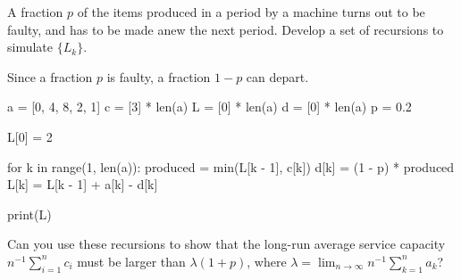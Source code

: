 \begin{exercise}
\label{ex:88}
 A fraction
$p$ of the items produced in a period by a machine  turns out to be faulty, and has to be made anew the next period.
 Develop a set of recursions to simulate $\{L_k\}$.
\begin{solution}

Since a fraction $p$ is faulty, a fraction $1-p$ can depart.
\begin{pyconsole}
a = [0, 4, 8, 2, 1]
c = [3] * len(a)
L = [0] * len(a)
d = [0] * len(a)
p = 0.2

L[0] = 2

for k in range(1, len(a)):
    produced = min(L[k - 1], c[k])
    d[k] = (1 - p) * produced
    L[k] = L[k - 1] + a[k] - d[k]

print(L)
\end{pyconsole}

 Can you use these recursions to show that the long-run average service capacity $n^{-1}\sum_{i=1}^n c_i$ must be larger than $\lambda(1+p)$, where $\lambda = \lim_{n\to \infty} n^{-1}\sum_{k=1}^n a_k$?
\end{solution}
\end{exercise}



